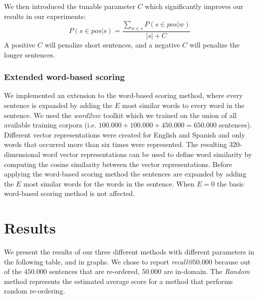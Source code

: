 \documentclass[11pt]{article}
\begin{document}
We then introduced the tunable parameter $C$ which significantly improves our results in our experiments:
\begin{equation} P(s\in pos | s)  = \frac{\sum_{w\in s} P(s\in pos | w)}{ | s | + C}  \end{equation}
A positive $C$ will penalize short sentences, and a negative $C$ will penalize the longer sentences.


\subsubsection{Extended word-based scoring}
We implemented an extension to the word-based scoring method, where every sentence is expanded by adding the $E$ most similar words to every word in the sentence. We used the \textit{word2vec} toolkit \cite{word2vec} which we trained on the union of all available training corpora (i.e. $100.000 + 100.000 + 450.000 = 650.000$ sentences). Different vector representations were created for English and Spanish and only words that occurred more than six times were represented. The resulting 320-dimensional word vector representations can be used to define word similarity by computing the cosine similarity between the vector representations. 
Before applying the word-based scoring method the sentences are expanded by adding the $E$ most similar words for the words in the sentence. When $E=0$ the basic word-based scoring method is not affected.

\section{Results}
\label{sec:results}
We present the results of our three different methods with different parameters in the following table, and in graphs. We chose to report \textit{recall@}$50.000$ because out of the $450.000$ sentences that are re-ordered, $50.000$ are in-domain. The \textit{Random} method represents the estimated average score for a method that performs random re-ordering.
\end{document}
